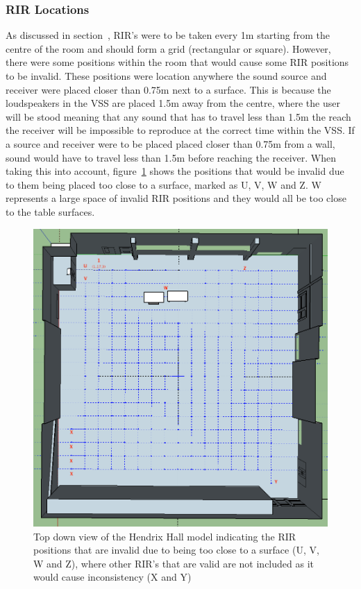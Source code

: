 \documentclass[../../main.tex]{subfiles}
\begin{document}
		\subsubsection{RIR Locations}
			As discussed in section~, \ac{RIR}'s were to be taken every 1m starting from the centre of the room and should form a grid (rectangular or square). However, there were some positions within the room that would cause some \ac{RIR} positions to be invalid. These positions were location anywhere the sound source and receiver were placed closer than 0.75m next to a surface. This is because the loudspeakers in the \ac{VSS} are placed 1.5m away from the centre, where the user will be stood meaning that any sound that has to travel less than 1.5m the reach the receiver will be impossible to reproduce at the correct time within the \ac{VSS}. If a source and receiver were to be placed placed closer than 0.75m from a wall, sound would have to travel less than 1.5m before reaching the receiver. When taking this into account, figure~\ref{incorrectRIRPositions} shows the positions that would be invalid due to them being placed too close to a surface, marked as U, V, W and Z. W represents a large space of invalid \ac{RIR} positions and they would all be too close to the table surfaces.

			\begin{figure}[H]
				\centerline{\includegraphics[scale = 0.4]{Sections/Implementation/Odeon/images/RIRPositions/RIRPositionAnnotated.png}}
				\caption{Top down view of the Hendrix Hall model indicating the \ac{RIR} positions that are invalid due to being too close to a surface (U, V, W and Z), where other \ac{RIR}'s that are valid are not included as it would cause inconsistency (X and Y)}
				\label{incorrectRIRPositions}
			\end{figure}
\end{document}
